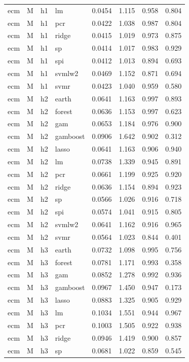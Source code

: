 \begin{ThreePartTable}
\begin{longtable}[t]{llclcccc}
ecm & M & h1 & lm & 0.0454 & 1.115 & 0.958 & 0.804\\
ecm & M & h1 & pcr & 0.0422 & 1.038 & 0.987 & 0.804\\
ecm & M & h1 & ridge & 0.0415 & 1.019 & 0.973 & 0.875\\
ecm & M & h1 & sp & 0.0414 & 1.017 & 0.983 & 0.929\\
ecm & M & h1 & spi & 0.0412 & 1.013 & 0.894 & 0.693\\
ecm & M & h1 & svmlw2 & 0.0469 & 1.152 & 0.871 & 0.694\\
ecm & M & h1 & svmr & 0.0423 & 1.040 & 0.959 & 0.580\\
\addlinespace
ecm & M & h2 & earth & 0.0641 & 1.163 & 0.997 & 0.893\\
ecm & M & h2 & forest & 0.0636 & 1.153 & 0.997 & 0.623\\
ecm & M & h2 & gam & 0.0653 & 1.184 & 0.976 & 0.900\\
ecm & M & h2 & gamboost & 0.0906 & 1.642 & 0.902 & 0.312\\
ecm & M & h2 & lasso & 0.0641 & 1.163 & 0.906 & 0.940\\
ecm & M & h2 & lm & 0.0738 & 1.339 & 0.945 & 0.891\\
ecm & M & h2 & pcr & 0.0661 & 1.199 & 0.925 & 0.920\\
ecm & M & h2 & ridge & 0.0636 & 1.154 & 0.894 & 0.923\\
ecm & M & h2 & sp & 0.0566 & 1.026 & 0.916 & 0.718\\
ecm & M & h2 & spi & 0.0574 & 1.041 & 0.915 & 0.805\\
ecm & M & h2 & svmlw2 & 0.0641 & 1.162 & 0.916 & 0.965\\
ecm & M & h2 & svmr & 0.0564 & 1.023 & 0.844 & 0.401\\
\addlinespace
ecm & M & h3 & earth & 0.0732 & 1.098 & 0.995 & 0.756\\
ecm & M & h3 & forest & 0.0781 & 1.171 & 0.993 & 0.358\\
ecm & M & h3 & gam & 0.0852 & 1.278 & 0.992 & 0.936\\
ecm & M & h3 & gamboost & 0.0967 & 1.450 & 0.947 & 0.173\\
ecm & M & h3 & lasso & 0.0883 & 1.325 & 0.905 & 0.929\\
ecm & M & h3 & lm & 0.1034 & 1.551 & 0.944 & 0.967\\
ecm & M & h3 & pcr & 0.1003 & 1.505 & 0.922 & 0.938\\
ecm & M & h3 & ridge & 0.0946 & 1.419 & 0.900 & 0.857\\
ecm & M & h3 & sp & 0.0681 & 1.022 & 0.859 & 0.545\\

\end{longtable}
\end{ThreePartTable}
